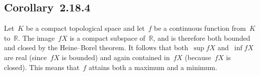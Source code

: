 \subsection{Corollary~2.18.4}

Let~$K$ be a compact topological space and let~$f$ be a continuous function from~$K$ to~$ℝ$.
The image~$f X$ is a compact subspace of~$ℝ$, and is therefore both bounded and closed by the Heine--Borel theorem.
It follows that both~$\sup f X$ and~$\inf f X$ are real (since~$f X$ is bounded) and again contained in~$f X$ (because~$f X$ is closed).
This means that~$f$ attains both a maximum and a minimum.
